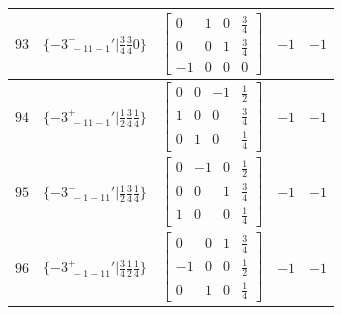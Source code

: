 \documentclass[fleqn,8pt]{jsarticle}
\begin{document}
\begin{longtable}{ccccc}
$ 93 $ & $ \{-3^{-}_{\,\,-11-1}{}'|\frac{3}{4} \frac{3}{4} 0\} $ & $ \begin{bmatrix} 0 & 1 & 0 & \frac{3}{4} \\ 0 & 0 & 1 & \frac{3}{4} \\ -1 & 0 & 0 & 0 \end{bmatrix} $ & $ -1 $ & $ -1 $ \\ \hline
$ 94 $ & $ \{-3^{+}_{\,\,-11-1}{}'|\frac{1}{2} \frac{3}{4} \frac{1}{4}\} $ & $ \begin{bmatrix} 0 & 0 & -1 & \frac{1}{2} \\ 1 & 0 & 0 & \frac{3}{4} \\ 0 & 1 & 0 & \frac{1}{4} \end{bmatrix} $ & $ -1 $ & $ -1 $ \\ \hline
$ 95 $ & $ \{-3^{-}_{\,\,-1-11}{}'|\frac{1}{2} \frac{3}{4} \frac{1}{4}\} $ & $ \begin{bmatrix} 0 & -1 & 0 & \frac{1}{2} \\ 0 & 0 & 1 & \frac{3}{4} \\ 1 & 0 & 0 & \frac{1}{4} \end{bmatrix} $ & $ -1 $ & $ -1 $ \\ \hline
$ 96 $ & $ \{-3^{+}_{\,\,-1-11}{}'|\frac{3}{4} \frac{1}{2} \frac{1}{4}\} $ & $ \begin{bmatrix} 0 & 0 & 1 & \frac{3}{4} \\ -1 & 0 & 0 & \frac{1}{2} \\ 0 & 1 & 0 & \frac{1}{4} \end{bmatrix} $ & $ -1 $ & $ -1 $ \\
\end{longtable}
\end{document}

